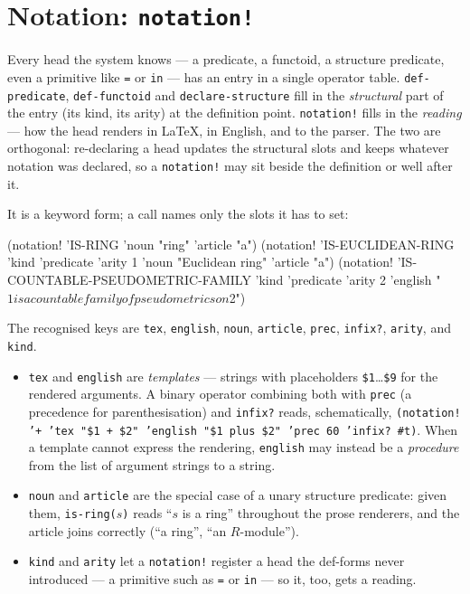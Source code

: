 \section{Notation: \texttt{notation!}}
\label{sec:notation}

Every head the system knows --- a predicate, a functoid, a structure predicate,
even a primitive like \texttt{=} or \texttt{in} --- has an entry in a single
operator table.  \texttt{def-predicate}, \texttt{def-functoid} and
\texttt{declare-structure} fill in the \emph{structural} part of the entry (its
kind, its arity) at the definition point.  \texttt{notation!} fills in the
\emph{reading} --- how the head renders in \LaTeX, in English, and to the
parser.  The two are orthogonal: re-declaring a head updates the structural slots
and keeps whatever notation was declared, so a \texttt{notation!} may sit beside
the definition or well after it.

It is a keyword form; a call names only the slots it has to set:
\begin{VNBcode}
(notation! 'IS-RING 'noun "ring" 'article "a")
(notation! 'IS-EUCLIDEAN-RING 'kind 'predicate 'arity 1
           'noun "Euclidean ring" 'article "a")
(notation! 'IS-COUNTABLE-PSEUDOMETRIC-FAMILY 'kind 'predicate 'arity 2
           'english "$1 is a countable family of pseudometrics on $2")
\end{VNBcode}

The recognised keys are
\texttt{tex}, \texttt{english}, \texttt{noun}, \texttt{article},
\texttt{prec}, \texttt{infix?}, \texttt{arity}, and \texttt{kind}.

\begin{itemize}
\item \texttt{tex} and \texttt{english} are \emph{templates} --- strings with
  placeholders \texttt{\$1}\ldots\texttt{\$9} for the rendered arguments.  A
  binary operator combining both with \texttt{prec} (a precedence for
  parenthesisation) and \texttt{infix?} reads, schematically,
  \texttt{(notation! '+ 'tex "\$1 + \$2" 'english "\$1 plus \$2" 'prec 60 'infix?
  \#t)}.  When a template cannot express the rendering, \texttt{english} may
  instead be a \emph{procedure} from the list of argument strings to a string.
\item \texttt{noun} and \texttt{article} are the special case of a unary
  structure predicate: given them, \texttt{is-ring($s$)} reads ``$s$ is a
  ring'' throughout the prose renderers, and the article joins correctly
  (``a ring'', ``an $R$-module'').
\item \texttt{kind} and \texttt{arity} let a \texttt{notation!} register a head
  the def-forms never introduced --- a primitive such as \texttt{=} or
  \texttt{in} --- so it, too, gets a reading.
\end{itemize}

